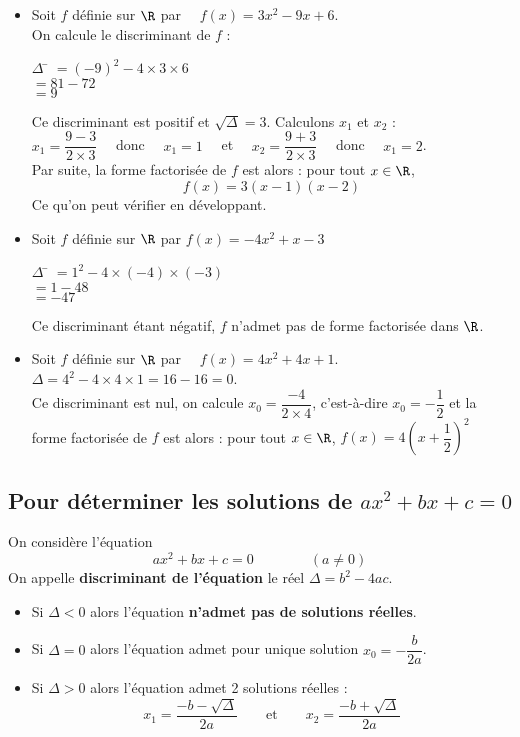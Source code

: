 \documentclass[a4paper,11pt,cours]{nsi}
\begin{document}
\begin{exemple}[s]
	\begin{itemize}
		\item 	Soit $f$ définie sur $\R$ par $\quad f(x)=3x^2-9x+6$.\\
		On calcule le discriminant de $f$ :
		\begin{tabbing}
			$\Delta$	\=	$=(-9)^2-4\times 3\times 6$\\
			\>	$=81-72$\\
			\>	$=9$
		\end{tabbing}
		Ce discriminant est positif et $\sqrt{\Delta}=3$. Calculons $x_1$ et $x_2$ :\\
		
		$x_1=\dfrac{9-3}{2\times 3}\quad$ donc $\quad x_1=1\quad$ et $\quad x_2=\dfrac{9+3}{2\times 3} \quad$ donc $\quad x_1=2$.\\
		
		Par suite, la forme factorisée de $f$ est alors : pour tout $x\in\R$,
		{\boldmath $$f(x)=3(x-1)(x-2)$$}
		Ce qu'on peut vérifier en développant.
		
		\item 	Soit $f$ définie sur $\R$ par $f(x)=-4x^2+x-3$
		\begin{tabbing}
			$\Delta$	\=	$=1^2-4\times (-4)\times(-3)$\\
			\>	$=1-48$\\
			\>	$=-47$
		\end{tabbing}
		Ce discriminant étant négatif, $f$ n'admet pas de forme factorisée dans $\R$.
		
		\item 		Soit $f$ définie sur $\R$ par $\quad f(x)=4x^2+4x+1$.\\
		$\Delta=4^2-4\times 4\times1=16-16=0$.\\
		Ce discriminant est nul, on calcule 
		$x_0=\dfrac{-4}{2\times 4}$, c'est-à-dire $x_0=-\dfrac{1}{2}$ et la forme factorisée de $f$ est alors : 
		pour tout $x\in\R$,
		{\boldmath $f(x)=4\left(x+\dfrac{1}{2}\right)^2$}
	\end{itemize}
\end{exemple}

\subsection{Pour déterminer les solutions de $ax^2+bx+c=0$}


\begin{propriete}
	On considère l'équation 
	{\boldmath$$ax^2+bx+c=0\qquad\qquad(a\neq 0)$$}
	On appelle \textbf{discriminant de l'équation} le réel $\Delta=b^2-4ac$.
	\begin{itemize}
		\item	Si $\Delta<0$ alors l'équation \textbf{n'admet pas de solutions réelles}.
		\item 	Si $\Delta=0$ alors l'équation admet pour unique solution {\boldmath$x_0=-\dfrac{b}{2a}$}.
		\item 	Si $\Delta>0$ alors l'équation admet 2 solutions réelles : {\boldmath $$x_1=\dfrac{-b-\sqrt{\Delta}}{2a}\qquad\text{et}\qquad 
			x_2=\dfrac{-b+\sqrt{\Delta}}{2a}$$}
	\end{itemize}
\end{propriete}
\end{document}
